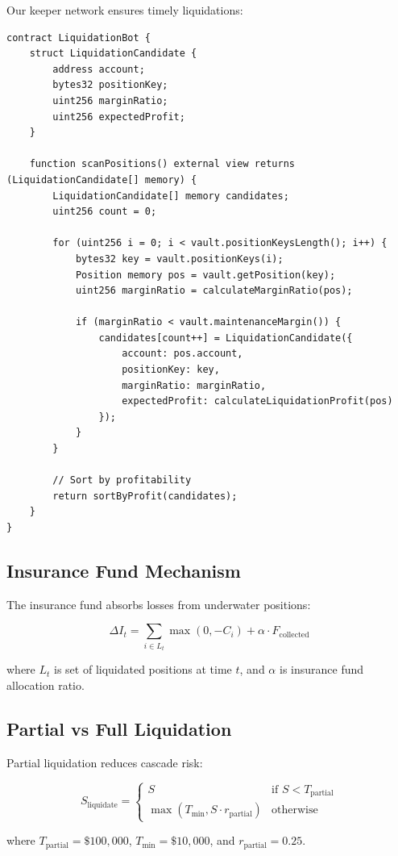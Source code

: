 Our keeper network ensures timely liquidations:

\begin{lstlisting}[caption={Liquidation Bot Implementation}]
contract LiquidationBot {
    struct LiquidationCandidate {
        address account;
        bytes32 positionKey;
        uint256 marginRatio;
        uint256 expectedProfit;
    }

    function scanPositions() external view returns (LiquidationCandidate[] memory) {
        LiquidationCandidate[] memory candidates;
        uint256 count = 0;

        for (uint256 i = 0; i < vault.positionKeysLength(); i++) {
            bytes32 key = vault.positionKeys(i);
            Position memory pos = vault.getPosition(key);
            uint256 marginRatio = calculateMarginRatio(pos);

            if (marginRatio < vault.maintenanceMargin()) {
                candidates[count++] = LiquidationCandidate({
                    account: pos.account,
                    positionKey: key,
                    marginRatio: marginRatio,
                    expectedProfit: calculateLiquidationProfit(pos)
                });
            }
        }

        // Sort by profitability
        return sortByProfit(candidates);
    }
}
\end{lstlisting}

\subsection{Insurance Fund Mechanism}

The insurance fund absorbs losses from underwater positions:

\begin{equation}
\Delta I_t = \sum_{i \in L_t} \max(0, -C_i) + \alpha \cdot F_{\text{collected}}
\end{equation}

where $L_t$ is set of liquidated positions at time $t$, and $\alpha$ is insurance fund allocation ratio.

\subsection{Partial vs Full Liquidation}

Partial liquidation reduces cascade risk:

\begin{equation}
S_{\text{liquidate}} = \begin{cases}
S & \text{if } S < T_{\text{partial}} \\
\max(T_{\text{min}}, S \cdot r_{\text{partial}}) & \text{otherwise}
\end{cases}
\end{equation}

where $T_{\text{partial}} = \$100,000$, $T_{\text{min}} = \$10,000$, and $r_{\text{partial}} = 0.25$.

